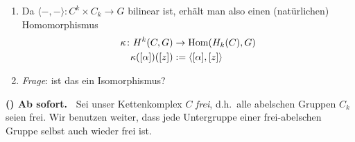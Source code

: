 \begin{kommentar}
  \begin{enumerate}
    \item 
      Da $\langle - ,- \rangle \colon C^k \times C_k \to G$ bilinear ist, erhält man also einen (natürlichen) Homomorphismus
      \begin{align*}
        \kappa \colon H^k(C,G) & \to \mathrm{Hom}(H_k(C),G) \\
        \kappa ([\alpha])([z]) & := \langle [\alpha],[z] \rangle
      \end{align*}
    \item
      \emph{Frage}: ist das ein Isomorphismus?
  \end{enumerate}
\end{kommentar}
\textbf{(\theprop) Ab sofort.\ }
Sei unser Kettenkomplex $C$ \emph{frei}, d.h.\ alle abelschen Gruppen $C_k$ seien frei.
Wir benutzen weiter, dass jede Untergruppe einer frei-abelschen Gruppe selbst auch wieder frei ist.
